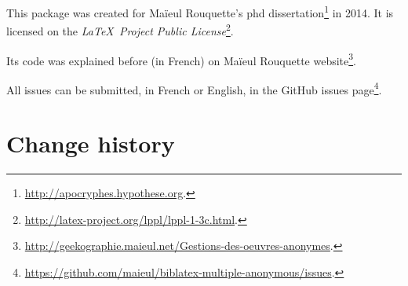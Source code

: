 \documentclass{ltxdockit}[2011/03/25]
\begin{document}
This package was created for Maïeul Rouquette's phd dissertation\footnote{\url{http://apocryphes.hypothese.org}.} in 2014. It is licensed on the \emph{\LaTeX\ Project Public License}\footnote{\url{http://latex-project.org/lppl/lppl-1-3c.html}.}. 

Its code was explained before (in French) on Maïeul Rouquette website\footnote{\url{http://geekographie.maieul.net/Gestions-des-oeuvres-anonymes}.}.

All issues can be submitted, in French or English, in the GitHub issues page\footnote{\url{https://github.com/maieul/biblatex-multiple-anonymous/issues}.}.

\section{Change history}
\end{document}
